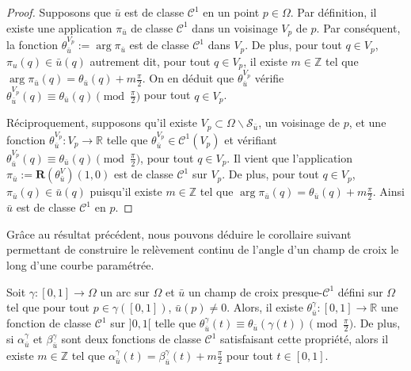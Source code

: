 \begin{proof}
    Supposons que $\bar{u}$ est de classe $\mathcal{C}^1$ en un point $p\in\Omega$. Par définition, il existe une application $\pi_{\bar{u}}$ de classe $\mathcal{C}^1$ dans un voisinage $V_p$ de $p$. Par conséquent, la fonction $\theta_{\bar{u}}^{V_p}:=\arg \pi_{\bar{u}}$ est de classe $\mathcal{C}^1$ dans $V_p$. De plus, pour tout $q\in V_p$, $\pi_u(q)\in\bar{u}(q)$ autrement dit, pour tout $q\in V_p$, il existe $m\in\mathbb{Z}$ tel que $\arg\pi_{\bar{u}}(q)=\theta_{\bar{u}}(q)+m\frac{\pi}{2}$. On en déduit que $\theta_{\bar{u}}^{V_p}$ vérifie $\theta^{V_p}_{\bar{u}}(q)\equiv\theta_{\bar{u}}(q)\pmod{\frac{\pi}{2}}$ pour tout $q\in V_p$.

    Réciproquement, supposons qu'il existe $V_p\subset \Omega \backslash \mathcal{S}_{\bar{u}}$, un voisinage de $p$, et une fonction $\theta_{\bar{u}}^{V_p}:V_p \rightarrow \mathbb{R}$ telle que $\theta_{\bar{u}}^{V_p}\in \mathcal{C}^1(V_p)$ et vérifiant $\theta_{\bar{u}}^{V_p}(q)\equiv\theta_{\bar{u}}(q) \pmod{\frac{\pi}{2}}$, pour tout $q\in V_p$. Il vient que l'application $\pi_{\bar{u}}:=\mathbf{R}(\theta_{\bar{u}}^V)(1,0)$ est de classe $\mathcal{C}^1$ sur $V_p$. De plus, pour tout $q\in V_p$, $\pi_{\bar{u}}(q)\in \bar{u}(q)$ puisqu'il existe $m\in\mathbb{Z}$ tel que $\arg\pi_{\bar{u}}(q)=\theta_{\bar{u}}(q)+m\frac{\pi}{2}$. Ainsi $\bar{u}$ est de classe $\mathcal{C}^1$ en $p$.
\end{proof}


Grâce au résultat précédent, nous pouvons déduire le corollaire suivant permettant de construire le relèvement continu de l'angle d'un champ de croix le long d'une courbe paramétrée.

\begin{corollary}
    \label{cor:relevement_continu}
    Soit $\gamma: [0, 1] \longrightarrow \Omega$ un arc sur $\Omega$ et $\bar{u}$ un champ de croix presque-$\mathcal{C}^1$ défini sur $\Omega$ tel que pour tout $p\in\gamma([0, 1])$, $\bar{u}(p)\neq 0$. Alors, il existe $\theta^\gamma_{\bar{u}}: [0, 1] \longrightarrow \mathbb{R}$  une fonction de classe $\mathcal{C}^1$ sur $]0,1[$ telle que $\theta^\gamma_{\bar{u}}(t) \equiv \theta_{\bar{u}}(\gamma(t)) \pmod{\frac{\pi}{2}}$. De plus, si $\alpha_{\bar{u}}^\gamma$ et $\beta_{\bar{u}}^\gamma$ sont deux fonctions de classe $\mathcal{C}^1$ satisfaisant cette propriété, alors il existe $m \in \mathbb{Z}$ tel que $\alpha_{\bar{u}}^\gamma(t) = \beta_{\bar{u}}^\gamma(t) + m\frac{\pi}{2}$ pour tout $t \in [0, 1]$.
\end{corollary}

